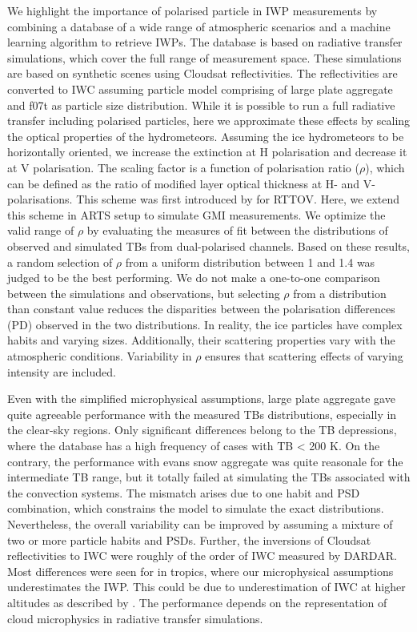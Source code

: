 \documentclass[amt, manuscript]{copernicus}
\begin{document}
We highlight the importance of polarised particle in IWP measurements by combining a database of a wide range of atmospheric scenarios and a machine learning algorithm to retrieve IWPs. The database is based on radiative transfer simulations, which  cover the full range of measurement space. These simulations are based on synthetic scenes using Cloudsat reflectivities. The reflectivities are converted to IWC assuming particle model comprising of large plate aggregate and f07t as particle size distribution. While it is possible to run a full radiative transfer including polarised particles, here we approximate these effects by scaling the optical properties of the hydrometeors. Assuming the ice hydrometeors to be horizontally oriented, we increase the extinction at H polarisation and decrease it at V polarisation. The scaling factor is a function of polarisation ratio ($\rho$), which can be defined as the ratio of modified layer optical thickness at H- and V- polarisations. This scheme was first introduced by \citet{barlakas:intro:21} for RTTOV. Here, we extend this scheme in ARTS setup to simulate GMI measurements. We optimize the valid range of $\rho$ by evaluating the measures of fit between the distributions of observed and simulated TBs from dual-polarised channels. Based on these results, a random selection of $\rho$ from a uniform distribution between 1 and 1.4  was judged to be the best performing. We do not make a one-to-one comparison between the simulations and observations, but selecting $\rho$ from a distribution than constant value reduces the disparities between the polarisation differences (PD) observed in the two distributions. In reality, the ice particles have complex habits and varying sizes. Additionally, their scattering properties vary with the atmospheric conditions. Variability in $\rho$ ensures that scattering effects of varying intensity are included. 

Even with the simplified microphysical assumptions, large plate aggregate gave quite agreeable performance with the measured TBs distributions, especially in the clear-sky regions. Only significant differences belong to the TB depressions, where the database has a high frequency of cases with TB < 200\,\,K. On the contrary, the performance with evans snow aggregate was quite reasonale for the intermediate TB range, but it totally failed at simulating the TBs associated with the convection systems. The mismatch arises due to one habit and PSD combination, which constrains the model to simulate the exact distributions. Nevertheless, the overall variability can be improved by assuming a mixture of two or more particle habits and PSDs. Further, the inversions of Cloudsat reflectivities to IWC were roughly of the order of IWC measured by DARDAR. Most differences were seen for in tropics, where our microphysical assumptions underestimates the IWP. This could be due to underestimation of IWC at higher altitudes as described by \citet{ekelund2020using}. The performance depends on the representation of cloud microphysics in radiative transfer simulations.  
\end{document}

